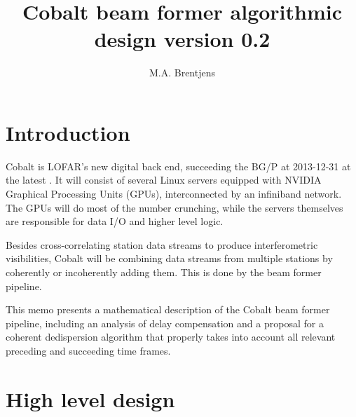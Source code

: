 \documentclass[a4paper,twoside]{article}
\title{Cobalt beam former algorithmic design version 0.2}
\author{M.A. Brentjens}
\newcommand{\cobalt}{Cobalt\xspace}
\newcommand{\bgp}{BG/P\xspace}
\begin{document}
\maketitle

\tableofcontents

\pagebreak


%
%

\section{Introduction}

\cobalt is LOFAR's new digital back end, succeeding the \bgp at
2013-12-31 at the latest \citep{CobaltRequirements2013}. It will
consist of several Linux servers equipped with NVIDIA Graphical
Processing Units (GPUs), interconnected by an infiniband network.  The
GPUs will do most of the number crunching, while the servers
themselves are responsible for data I/O and higher level logic.

Besides cross-correlating station data streams to produce
interferometric visibilities, \cobalt will be combining data
streams from multiple stations by coherently or incoherently adding
them. This is done by the beam former pipeline.

This memo presents a mathematical description of the \cobalt beam
former pipeline, including an analysis of delay compensation%
and a proposal for a coherent dedispersion algorithm that properly takes
into account all relevant preceding and succeeding time frames.




%
%

\section{High level design}
\end{document}
